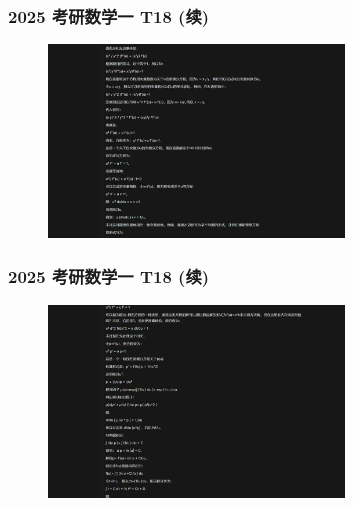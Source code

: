 \begin{frame}
\frametitle{2025 考研数学一 T18 (续)}
\begin{figure}
    \centering
    \includegraphics[width=0.7\textwidth]{./pic/11.png} %
    \label{fig:kaoyan_solution_3}
\end{figure}
\end{frame}

\begin{frame}
\frametitle{2025 考研数学一 T18 (续)}
\begin{figure}
    \centering
    \includegraphics[width=0.7\textwidth]{./pic/12.png} %
    \label{fig:kaoyan_solution_4}
\end{figure}
\end{frame}

